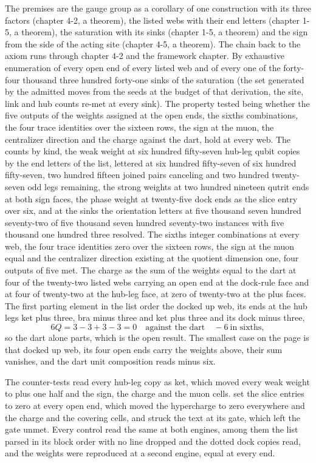 \begin{chproof}[census]
The premises are the gauge group as a corollary of one construction with its three factors (chapter 4-2, a theorem), the listed webs with their end letters (chapter 1-5, a theorem), the saturation with its sinks (chapter 1-5, a theorem) and the sign from the side of the acting site (chapter 4-5, a theorem). The chain back to the axiom runs through chapter 4-2 and the framework chapter. By exhaustive enumeration of every open end of every listed web and of every one of the forty-four thousand three hundred forty-one sinks of the saturation (the set generated by the admitted moves from the seeds at the budget of that derivation, the site, link and hub counts re-met at every sink). The property tested being whether the five outputs of the weights assigned at the open ends, the sixths combinations, the four trace identities over the sixteen rows, the sign at the muon, the centralizer direction and the charge against the dart, hold at every web. The counts by kind, the weak weight at six hundred fifty-seven hub-leg qubit copies by the end letters of the list, lettered at six hundred fifty-seven of six hundred fifty-seven, two hundred fifteen joined pairs canceling and two hundred twenty-seven odd legs remaining, the strong weights at two hundred nineteen qutrit ends at both sign faces, the phase weight at twenty-five dock ends as the slice entry over six, and at the sinks the orientation letters at five thousand seven hundred seventy-two of five thousand seven hundred seventy-two instances with five thousand one hundred three resolved. The sixths integer combinations at every web, the four trace identities zero over the sixteen rows, the sign at the muon equal and the centralizer direction existing at the quotient dimension one, four outputs of five met. The charge as the sum of the weights equal to the dart at four of the twenty-two listed webs carrying an open end at the dock-rule face and at four of twenty-two at the hub-leg face, at zero of twenty-two at the plus faces. The first parting element in the list order the docked up web, its ends at the hub legs ket plus three, bra minus three and ket plus three and its dock minus three,
\begin{equation}
6Q = 3 - 3 + 3 - 3 = 0 \quad\text{against the dart}\quad -6 \ \text{in sixths} ,
\end{equation}
so the dart alone parts, which is the open result. The smallest case on the page is that docked up web, its four open ends carry the weights above, their sum vanishes, and the dart unit composition reads minus six.

The counter-tests read every hub-leg copy as ket, which moved every weak weight to plus one half and the sign, the charge and the muon cells. set the slice entries to zero at every open end, which moved the hypercharge to zero everywhere and the charge and the covering cells, and struck the text at its gate, which left the gate unmet. Every control read the same at both engines, among them the list parsed in its block order with no line dropped and the dotted dock copies read, and the weights were reproduced at a second engine, equal at every end.
\end{chproof}
